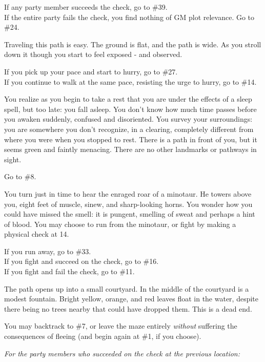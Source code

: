 \documentclass[white]{gl2018}
\begin{document}
\begin{large}
\begin{location}{34}
\begin{fromhere}
If any party member succeeds the check, go to \#39.\\
 If the entire party fails the check, you find nothing of GM plot relevance. Go to \#24.
\end{fromhere}
\end{location}
\begin{location}{35}
Traveling this path is easy. The ground is flat, and the path is wide. As you stroll down it though you start to feel exposed - and observed. 
\begin{fromhere}If you pick up your pace and start to hurry, go to \#27.\\
 If you continue to walk at the same pace, resisting the urge to hurry, go to \#14.
\end{fromhere}
\end{location}
\begin{location}{36}
You realize as you begin to take a rest that you are under the effects of a sleep spell, but too late: you fall asleep.  You don't know how much time passes before you awaken suddenly, confused and disoriented.  You survey your surroundings: you are somewhere you don't recognize, in a clearing, completely different from where you were when you stopped to rest.  There is a path in front of you, but it seems green and faintly menacing.  There are no other landmarks or pathways in sight.
\begin{fromhere}Go to \#8.\end{fromhere}
\end{location}
\begin{location}{37}
You turn just in time to hear the enraged roar of a minotaur.  He towers above you, eight feet of muscle, sinew, and sharp-looking horns.  You wonder how you could have missed the smell: it is pungent, smelling of sweat and perhaps a hint of blood.  You may choose to run from the minotaur, or fight by making a physical check at 14.
\begin{fromhere}
  If you run away, go to \#33.\\
If you fight and succeed on the check, go to \#16. \\
 If you fight and fail the check, go to \#11.
\end{fromhere}
\end{location}
\begin{location}{38}
The path opens up into a small courtyard. In the middle of the courtyard is a modest fountain.  Bright yellow, orange, and red leaves float in the water, despite there being no trees nearby that could have dropped them. This is a dead end.
\begin{fromhere} You may backtrack to \#7, or leave the maze entirely {\em without} suffering the consequences of fleeing (and begin again at \#1, if you choose).
\end{fromhere}
\end{location}
\begin{location}{39}
\emph{For the party members who succeeded on the check at the previous location:}


\end{location}
\end{large}
\end{document}
